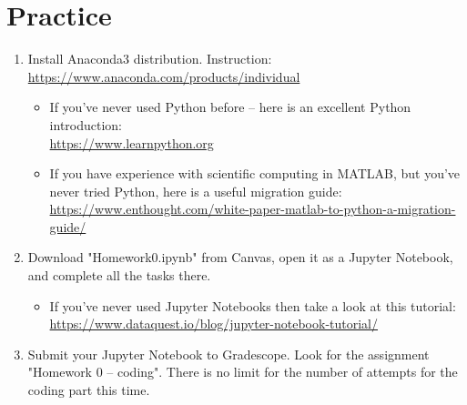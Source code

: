 \documentclass[11pt]{amsart}
\begin{document}
\section{Practice}
\begin{enumerate}
	\item Install Anaconda3 distribution. Instruction:\\ \href{https://www.anaconda.com/products/individual}{https://www.anaconda.com/products/individual}
		\begin{itemize}
			\item 		If you've never used Python before -- here is an excellent Python introduction: \\  \href{https://www.learnpython.org}{https://www.learnpython.org}
			\item If you have experience with scientific computing in MATLAB, but you've never tried Python, here is a useful migration guide: \\\href{https://www.enthought.com/white-paper-matlab-to-python-a-migration-guide/}{https://www.enthought.com/white-paper-matlab-to-python-a-migration-guide/}
		\end{itemize}
	\item Download "Homework0.ipynb" from Canvas, open it as a Jupyter Notebook, and complete all the tasks there.
		\begin{itemize}
			\item If you've never used Jupyter Notebooks then take a look at this tutorial:
		\href{https://www.dataquest.io/blog/jupyter-notebook-tutorial/}{https://www.dataquest.io/blog/jupyter-notebook-tutorial/}
		\end{itemize}

	\item Submit your Jupyter Notebook to Gradescope. Look for the assignment "Homework 0 -- coding". There is no limit for the number of attempts for the coding part this time. 
\end{enumerate}
\end{document}
